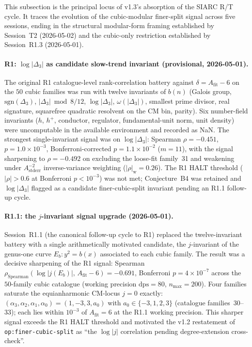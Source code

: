 \documentclass[11pt,a4paper]{article}
\theoremstyle{definition}
\theoremstyle{remark}
\begin{document}
This subsection is the principal locus of v1.3's absorption of
the SIARC R/T cycle. It traces the evolution of the cubic-modular
finer-split signal across five sessions, ending in the structural
modular-form framing established by Session~T2 (2026-05-02) and
the cubic-only restriction established by Session~R1.3 (2026-05-01).

\paragraph{R1: $\log|\Delta_3|$ as candidate slow-trend invariant
(provisional, 2026-05-01).}
The original R1 catalogue-level rank-correlation battery against
$\delta = A_{\mathrm{fit}} - 6$ on the $50$ cubic families was run
with twelve invariants of $b(n)$ (Galois group, $\mathrm{sgn}(\Delta_3)$,
$|\Delta_3| \bmod 8/12$, $\log|\Delta_3|$, $\omega(|\Delta_3|)$,
smallest prime divisor, real signature, squarefree quadratic
resolvent on the CM bin, parity). Six number-field invariants
($h$, $h^+$, conductor, regulator, fundamental-unit norm, unit
density) were uncomputable in the available environment and recorded
as NaN. The strongest single-invariant signal was on $\log|\Delta_3|$:
Spearman $\rho=-0.451$, $p=1.0\times 10^{-3}$, Bonferroni-corrected
$p=1.1\times 10^{-2}$ ($m=11$), with the signal sharpening to
$\rho=-0.492$ on excluding the loose-fit family~31 and weakening
under $A_{\mathrm{stderr}}^{-2}$ inverse-variance weighting
($|\rho|_{\mathrm{w}}=0.26$). The R1 HALT threshold ($|\rho|>0.6$ at
Bonferroni $p<10^{-3}$) was not met; Conjecture~B4 was retained and
$\log|\Delta_3|$ flagged as a candidate finer-cubic-split invariant
pending an R1.1 follow-up cycle.

\paragraph{R1.1: the $j$-invariant signal upgrade (2026-05-01).}
Session~R1.1 (the canonical follow-up cycle to R1) replaced the
twelve-invariant battery with a single arithmetically motivated
candidate, the $j$-invariant of the genus-one curve $E_b: y^2 = b(x)$
associated to each cubic family. The result was a decisive sharpening
of the R1 signal: Spearman
$\rho_{\mathrm{Spearman}}(\log|j(E_b)|,\, A_{\mathrm{fit}}-6) = -0.691$,
Bonferroni $p=4\times 10^{-7}$ across the $50$-family cubic
catalogue (working precision $\mathrm{dps}=80$, $n_{\max}=200$).
Four families saturate the equianharmonic CM-locus $j=0$ exactly:
$(\alpha_3,\alpha_2,\alpha_1,\alpha_0) = (1,-3,3,a_0)$ with
$a_0\in\{-3,1,2,3\}$ (catalogue families~30--33); each lies within
$10^{-3}$ of $A_{\mathrm{fit}}=6$ at the R1.1 working precision. This
sharper signal exceeds the R1 HALT threshold and motivated the v1.2
restatement of \texttt{op:finer-cubic-split} as ``the $\log|j|$
correlation pending degree-extension cross-check''.
\end{document}
